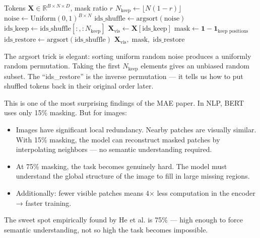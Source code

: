 \documentclass[12pt, a4paper]{report}
\newcommand{\R}{\mathbb{R}}
\newcommand{\mat}[1]{\mathbf{#1}}
\begin{document}
\begin{algorithm}[H]
\caption{Random Masking (from \texttt{mae.py})}
\begin{algorithmic}[1]
\Require Tokens $\mat{X} \in \R^{B \times N \times D}$, mask ratio $r$
\State $N_{\text{keep}} \gets \lfloor N(1 - r) \rfloor$ 
\State $\text{noise} \gets \text{Uniform}(0, 1)^{B \times N}$ 
\State $\text{ids\_shuffle} \gets \text{argsort}(\text{noise})$ 
\State $\text{ids\_keep} \gets \text{ids\_shuffle}[:, :N_{\text{keep}}]$ 
\State $\mat{X}_{\text{vis}} \gets \mat{X}[\text{ids\_keep}]$ 
\State $\text{mask} \gets \mathbf{1} - \mathbf{1}_{\text{keep positions}}$ 
\State $\text{ids\_restore} \gets \text{argsort}(\text{ids\_shuffle})$ 
\State \Return $\mat{X}_{\text{vis}},\; \text{mask},\; \text{ids\_restore}$
\end{algorithmic}
\end{algorithm}

The argsort trick is elegant: sorting uniform random noise produces a uniformly random permutation. Taking the first $N_{\text{keep}}$ elements gives an unbiased random subset. The ``ids\_restore'' is the inverse permutation — it tells us how to put shuffled tokens back in their original order later.

\begin{conceptbox}
This is one of the most surprising findings of the MAE paper. In NLP, BERT uses only 15\% masking. But for images:

\begin{itemize}
    \item Images have significant local redundancy. Nearby patches are visually similar. With 15\% masking, the model can reconstruct masked patches by interpolating neighbors — no semantic understanding required.
    \item At 75\% masking, the task becomes genuinely hard. The model must understand the global structure of the image to fill in large missing regions.
    \item Additionally: fewer visible patches means 4× less computation in the encoder → faster training.
\end{itemize}

The sweet spot empirically found by He et al. is 75\% — high enough to force semantic understanding, not so high the task becomes impossible.
\end{conceptbox}
\end{document}
